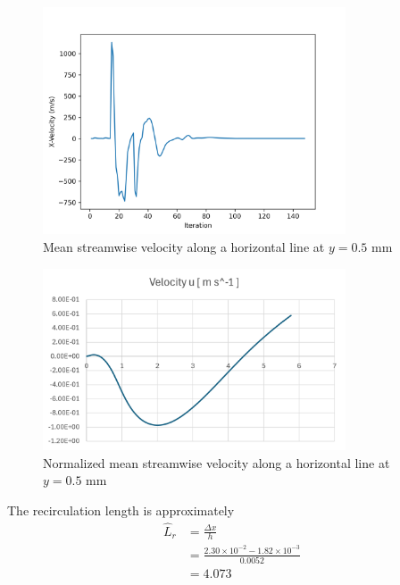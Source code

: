 \begin{figure}[H]
    \centering
    \includegraphics[width=0.8\textwidth]{Questions/Figures/X-Velocity.png}
    \caption{Mean streamwise velocity along a horizontal line at $y = 0.5$ mm}
\end{figure}
\begin{figure}[H]
    \centering
    \includegraphics[width=0.8\textwidth]{Questions/Figures/Normalized x-velocity.png}
    \caption{Normalized mean streamwise velocity along a horizontal line at $y = 0.5$ mm}
\end{figure}
The recirculation length is approximately
\begin{align*}
    \hat{L}_r &= \frac{\Delta x}{h} \\
    &= \frac{2.30 \times 10^{-2} - 1.82 \times 10^{-3}}{0.0052} \\
    &= \boxed{4.073}
\end{align*}


